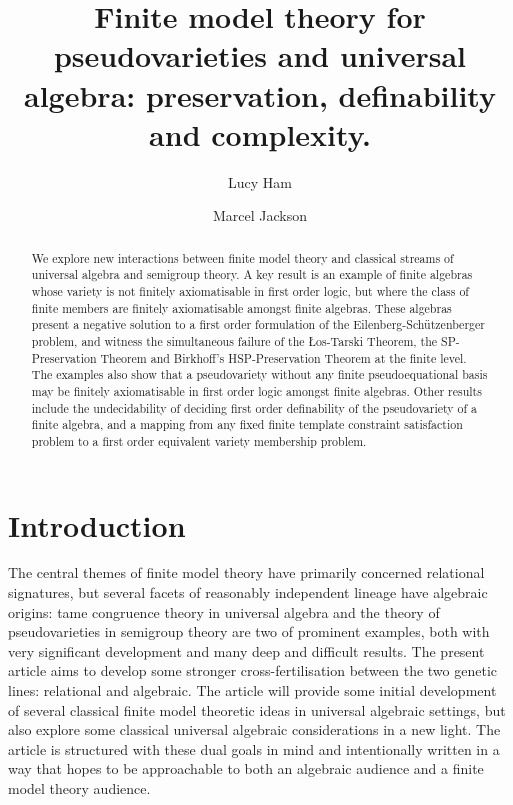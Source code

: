 \documentclass[reqno]{amsart}
\theoremstyle{plain}
\theoremstyle{definition}
\begin{document}
\title[Preservation, definability and complexity]{Finite model theory for pseudovarieties and universal algebra: preservation, definability and complexity.}


\author{Lucy Ham}
\address{MACSYS, School of Mathematics and Statistics and School of Biosciences, University of Melbourne, Victoria 3010
Australia} 
\author{Marcel Jackson}
\address{Department of Mathematical and Physical Sciences, La Trobe University, Victoria  3086,
Australia} 

\keywords{}

\begin{abstract}
We explore new interactions between finite model theory and classical streams of universal algebra and semigroup theory.  A key result is an example of finite algebras whose variety is not finitely axiomatisable in first order logic, but where the class of finite members are finitely axiomatisable amongst finite algebras.  
These algebras present a negative solution to a first order formulation of the Eilenberg-Sch\"utzenberger problem, and witness the simultaneous failure of the {\L}os-Tarski Theorem, the SP-Preservation Theorem and Birkhoff's HSP-Preservation Theorem at the finite level.  
The examples also show that a pseudovariety without any finite pseudoequational basis may be finitely axiomatisable in first order logic amongst finite algebras.  
Other results include the undecidability of deciding first order definability of the pseudovariety of a finite algebra, and a mapping from any fixed finite template constraint satisfaction problem to a first order equivalent variety membership problem.
\end{abstract}

\maketitle

\section{Introduction}
The central themes of finite model theory have primarily concerned relational signatures, but several facets of reasonably independent lineage have algebraic origins: tame congruence theory in universal algebra \cite{hobmck} and the theory of pseudovarieties in semigroup theory \cite{alm,eil} are two of prominent examples, both with very significant development and many deep and difficult results. 
The present article aims to develop some stronger cross-fertilisation between the two genetic lines: relational and algebraic.  The article will provide some initial development of several classical finite model theoretic ideas in universal algebraic settings, but also  explore some classical universal algebraic considerations in a new light.  The article is structured with these dual goals in mind and intentionally written in a way that hopes to be approachable to both an algebraic audience and a finite model theory audience.
\end{document}
